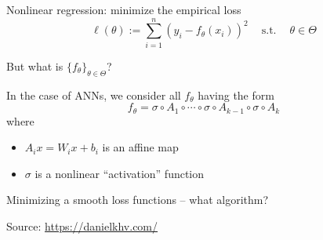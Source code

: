 \documentclass[
    xcolor={svgnames,dvipsnames},
    hyperref={colorlinks, citecolor=DeepPink4, linkcolor=DarkRed, urlcolor=DarkBlue}
    ]{beamer}  %
\newcommand{\st}{\ensuremath{\ \mathrm{s.t.}\ }}
\newcommand{\1}{\mathbbm 1}
\begin{document}
\begin{frame}

    Nonlinear regression: minimize the empirical loss
    \begin{equation*}
        \ell(\theta) := \sum_{i=1}^n (y_i - f_\theta(x_i))^2
        \quad \st \quad \theta \in \Theta
    \end{equation*}


    \pause
    But what is $\{f_\theta\}_{\theta \in \Theta}$?

    \pause
    \vspace{0.5em}
    In the case of ANNs, we consider all $f_\theta$ having the form
    \begin{equation*}
        f_\theta
        = \sigma \circ A_{1} 
            \circ \cdots \circ \sigma \circ A_{k-1}  \circ \sigma \circ A_{k}
    \end{equation*}
    where
    \begin{itemize}
        \item $A_{i} x = W_{i} x + b_{i} $ is an affine map 
        \vspace{0.5em}
        \item $\sigma$ is a nonlinear ``activation'' function
    \end{itemize}

\end{frame}


\begin{frame}
    

    Minimizing a smooth loss functions  -- what algorithm?
    
    \begin{figure}
       \begin{center}
       \end{center}
    \end{figure}

    Source: \url{https://danielkhv.com/}

\end{frame}
\end{document}
